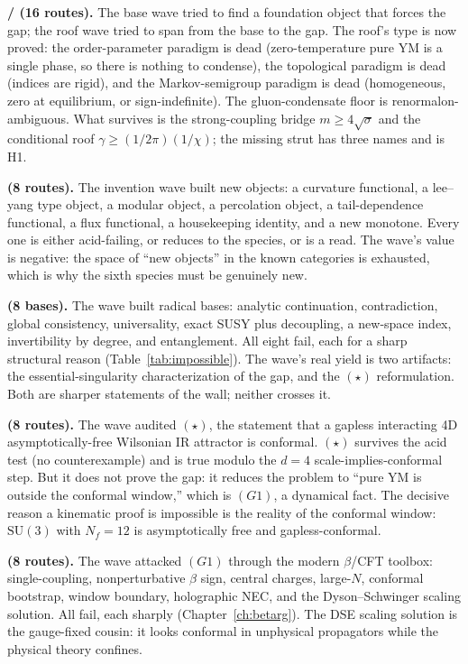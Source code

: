 \textbf{/ (16 routes).} The base wave tried to find a foundation object
that forces the gap; the roof wave tried to span from the base to the gap. The roof's type is now
proved: the order-parameter paradigm is dead (zero-temperature pure YM is a single phase, so
there is nothing to condense), the topological paradigm is dead (indices are rigid), and the
Markov-semigroup paradigm is dead (homogeneous, zero at equilibrium, or sign-indefinite). The
gluon-condensate floor is renormalon-ambiguous. What survives is the strong-coupling bridge
$m\ge4\sqrt\sigma$ and the conditional roof $\gamma\ge(1/2\pi)(1/\chi)$; the missing strut has
three names and is H1.

\textbf{ (8 routes).} The invention wave built new objects: a curvature functional,
a lee--yang type object, a modular object, a percolation object, a tail-dependence functional, a
flux functional, a housekeeping identity, and a new monotone. Every one is either acid-failing,
or reduces to the species, or is a read. The wave's value is negative: the space of ``new
objects'' in the known categories is exhausted, which is why the sixth species must be genuinely
new.

\textbf{ (8 bases).} The wave built radical bases: analytic continuation,
contradiction, global consistency, universality, exact SUSY plus decoupling, a new-space index,
invertibility by degree, and entanglement. All eight fail, each for a sharp structural reason
(Table~\ref{tab:impossible}). The wave's real yield is two artifacts: the essential-singularity
characterization of the gap, and the $(\star)$ reformulation. Both are sharper statements of the
wall; neither crosses it.

\textbf{ (8 routes).} The wave audited $(\star)$, the statement that a gapless
interacting 4D asymptotically-free Wilsonian IR attractor is conformal. $(\star)$ survives the
acid test (no counterexample) and is true modulo the $d=4$ scale-implies-conformal step. But it
does not prove the gap: it reduces the problem to ``pure YM is outside the conformal window,''
which is $(G1)$, a dynamical fact. The decisive reason a kinematic proof is impossible is the
reality of the conformal window: $\mathrm{SU}(3)$ with $N_f=12$ is asymptotically free and
gapless-conformal.

\textbf{ (8 routes).} The wave attacked $(G1)$ through the modern $\beta$/CFT toolbox:
single-coupling, nonperturbative $\beta$ sign, central charges, large-$N$, conformal bootstrap,
window boundary, holographic NEC, and the Dyson--Schwinger scaling solution. All fail, each
sharply (Chapter~\ref{ch:betarg}). The DSE scaling solution is the gauge-fixed cousin: it looks
conformal in unphysical propagators while the physical theory confines.


